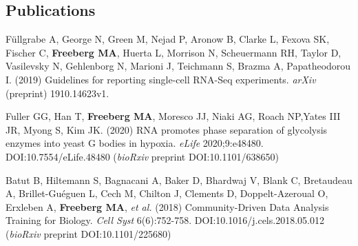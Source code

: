 \documentclass[margin,line]{res}
\begin{document}
\begin{resume}


\section{\sc Publications}

Füllgrabe A, George N, Green M, Nejad P, Aronow B, Clarke L, Fexova SK, Fischer C, {\bf Freeberg MA}, Huerta L, Morrison N, Scheuermann RH, Taylor D, Vasilevsky N, Gehlenborg N, Marioni J, Teichmann S, Brazma A, Papatheodorou I. (2019) Guidelines for reporting single-cell RNA-Seq experiments. {\em arXiv} (preprint) 1910.14623v1.

Fuller GG, Han T, {\bf Freeberg MA}, Moresco JJ, Niaki AG, Roach NP,Yates III JR, Myong S, Kim JK. (2020) RNA promotes phase separation of glycolysis enzymes into yeast G bodies in hypoxia. {\em eLife} 2020;9:e48480. DOI:10.7554/eLife.48480 ({\em bioRxiv} preprint DOI:10.1101/638650)


Batut B, Hiltemann S, Bagnacani A, Baker D, Bhardwaj V, Blank C, Bretaudeau A, Brillet-Guéguen L, Cech M, Chilton J, Clements D, Doppelt-Azeroual O, Erxleben A, {\bf Freeberg MA}, {\em et al.} (2018) Community-Driven Data Analysis Training for Biology. {\em Cell Syst} 6(6):752-758. DOI:10.1016/j.cels.2018.05.012 ({\em bioRxiv} preprint DOI:10.1101/225680)


\end{resume}
\end{document}
